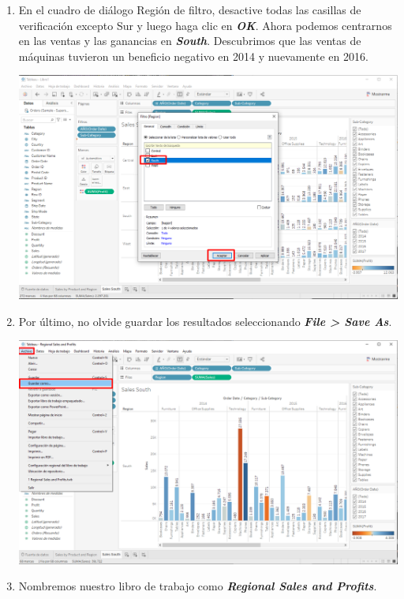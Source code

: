 \documentclass[12pt,letterpaper]{article}
\newcommand\tab[1][1cm]{\hspace*{#1}}
\begin{document}
\begin{enumerate}[\tab 1.]
\begin{center}
        \end{center}
        \item En el cuadro de diálogo Región de filtro, desactive todas las casillas de verificación excepto Sur y luego haga clic en \textit{\textbf{OK}}. Ahora podemos centrarnos en las ventas y las ganancias en \textit{\textbf{South}}. Descubrimos que las ventas de máquinas tuvieron un beneficio negativo en 2014 y nuevamente en 2016.
        \begin{center}
            \includegraphics[width=15cm]{./img/img29.png}
        \end{center}
        \item Por último, no olvide guardar los resultados seleccionando \textit{\textbf{File > Save As}}.
        \begin{center}
            \includegraphics[width=15cm]{./img/img30.png}
        \end{center}
        \item Nombremos nuestro libro de trabajo como \textit{\textbf{Regional Sales and Profits}}.
        \begin{center}

\end{center}
\end{enumerate}
\end{document}
